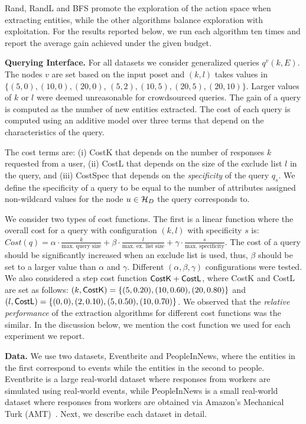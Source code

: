 Rand, RandL and BFS promote the exploration of the action space when extracting entities, while the other algorithms balance exploration with exploitation. For the results reported below, we run each algorithm ten times and report the average gain achieved under the given budget.

\noindent\textbf{Querying Interface.} For all datasets we consider generalized queries $q^v(k,E)$. The nodes $v$ are set based on the input poset and $(k,l)$ takes values in {\small $\{(5,0), (10,0), (20,0)$, $(5,2), (10,5), (20,5), (20,10)\}$}. Larger values of $k$ or $l$ were deemed unreasonable for crowdsourced queries. The gain of a query is computed as the number of new entities extracted. The cost of each query is computed using an additive model over three terms that depend on the characteristics of the query. 

The cost terms are: (i) {\sf CostK} that depends on the number of responses $k$ requested from a user, (ii) {\sf CostL} that depends on the size of the exclude list $l$ in the query, and (iii) {\sf CostSpec} that depends on the {\em specificity} of the query $q_s$. We define the specificity of a query to be equal to the number of attributes assigned non-wildcard values for the node $u \in \mathcal{H}_D$ the query corresponds to. 

We consider two types of cost functions. The first is a linear function where the overall cost for a query with configuration $(k,l)$ with specificity $s$ is:{\scriptsize $Cost(q) = \alpha \cdot \frac{k}{\mbox{max. query size}} + \beta \cdot  \frac{l}{\mbox{max. ex. list size}} + \gamma \cdot  \frac{s}{\mbox{max. specificity}} $}. The cost of a query should be significantly increased when an exclude list is used, thus, $\beta$ should be set to a larger value than $\alpha$ and $\gamma$. Different $(\alpha, \beta, \gamma)$ configurations were tested. We also considered a step cost function ${\sf CostK} + {\sf CostL}$, where {\sf CostK} and {\sf CostL} are set as follows: $(k,{\sf CostK}) = \{(5,0.20), (10,0.60), (20,0.80)\}$ and $(l,{\sf CostL}) = \{(0,0), (2,0.10), (5,0.50), (10,0.70)\}$. We observed that the {\em relative performance} of the extraction algorithms for different cost functions was the similar. In the discussion below, we mention the cost function we used for each experiment we report. 

\noindent\textbf{Data.} We use two datasets, Eventbrite and PeopleInNews, where the entities in the first correspond to events while the entities in the second to people. Eventbrite is a large real-world dataset where responses from workers are simulated using real-world events, while PeopleInNews is a small real-world dataset where responses from workers are obtained via Amazon's Mechanical Turk (AMT)~\cite{mturk}. Next, we describe each dataset in detail.


